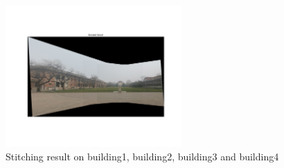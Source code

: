 \documentclass[]{article}
\begin{document}
\begin{figure}[h]
	\centering
	\includegraphics[width=0.6\textwidth]{panorama.png}
	\caption{Stitching result on building1, building2, building3 and building4}
	\label{fig:stitch3}
\end{figure}
\end{document}
